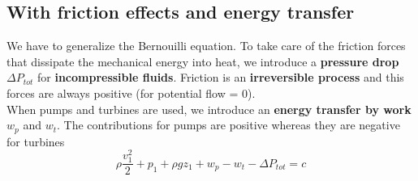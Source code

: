 			\subsection{With friction effects and energy transfer}
				We have to generalize the Bernouilli equation. To take care of the friction forces that dissipate the mechanical energy into heat, we introduce a \textbf{pressure drop} $\Delta P_{tot}$ for \textbf{incompressible fluids}. Friction is an \textbf{irreversible process} and this forces are always positive (for potential flow = 0). \\
				When pumps and turbines are used, we introduce an \textbf{energy transfer by work} $w_p$ and $w_t$. The contributions for pumps are positive whereas they are negative for turbines 
				\begin{equation}
					\rho \frac{v_1^2}{2} + p_1 + \rho gz_1 + w_p -w_t - \Delta P_{tot} = c
				\end{equation}
				
